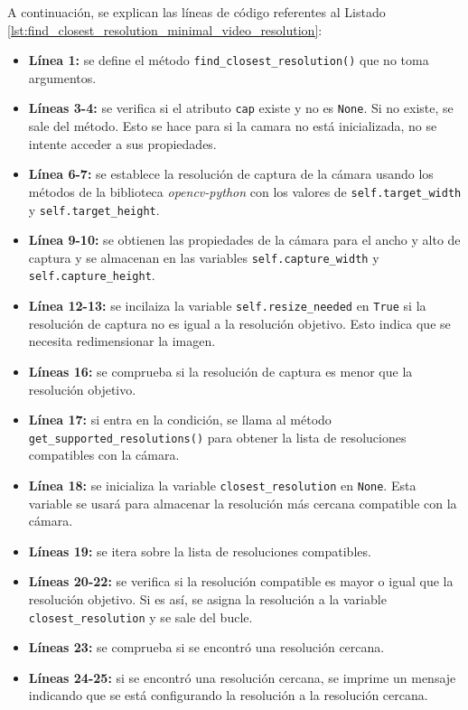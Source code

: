 A continuación, se explican las líneas de código referentes al Listado \ref{lst:find_closest_resolution_minimal_video_resolution}:
\begin{itemize}
    \item \textbf{Línea 1:} se define el método \texttt{find\_closest\_resolution()} que no toma argumentos.
    \item \textbf{Líneas 3-4:} se verifica si el atributo \texttt{cap} existe y no es \texttt{None}. Si no existe, se sale del método. Esto se hace para si la camara no está inicializada, no se intente acceder a sus propiedades.
    \item \textbf{Línea 6-7:} se establece la resolución de captura de la cámara usando los métodos de la biblioteca \textit{opencv-python} con los valores de \texttt{self.target\_width} y \texttt{self.target\_height}.
    \item \textbf{Línea 9-10:} se obtienen las propiedades de la cámara para el ancho y alto de captura y se almacenan en las variables \texttt{self.capture\_width} y \texttt{self.capture\_height}.
    \item \textbf{Línea 12-13:} se incilaiza la variable \texttt{self.resize\_needed} en \texttt{True} si la resolución de captura no es igual a la resolución objetivo. Esto indica que se necesita redimensionar la imagen.
    \item \textbf{Líneas 16:} se comprueba si la resolución de captura es menor que la resolución objetivo. 
    \item \textbf{Línea 17:} si entra en la condición, se llama al método \texttt{get\_supported\_resolutions()} para obtener la lista de resoluciones compatibles con la cámara.
    \item \textbf{Línea 18:} se inicializa la variable \texttt{closest\_resolution} en \texttt{None}. Esta variable se usará para almacenar la resolución más cercana compatible con la cámara.
    \item \textbf{Líneas 19:} se itera sobre la lista de resoluciones compatibles.
    \item \textbf{Líneas 20-22:} se verifica si la resolución compatible es mayor o igual que la resolución objetivo. Si es así, se asigna la resolución a la variable \texttt{closest\_resolution} y se sale del bucle.
    \item \textbf{Líneas 23:} se comprueba si se encontró una resolución cercana.
    \item \textbf{Líneas 24-25:} si se encontró una resolución cercana, se imprime un mensaje indicando que se está configurando la resolución a la resolución cercana. 

\end{itemize}
